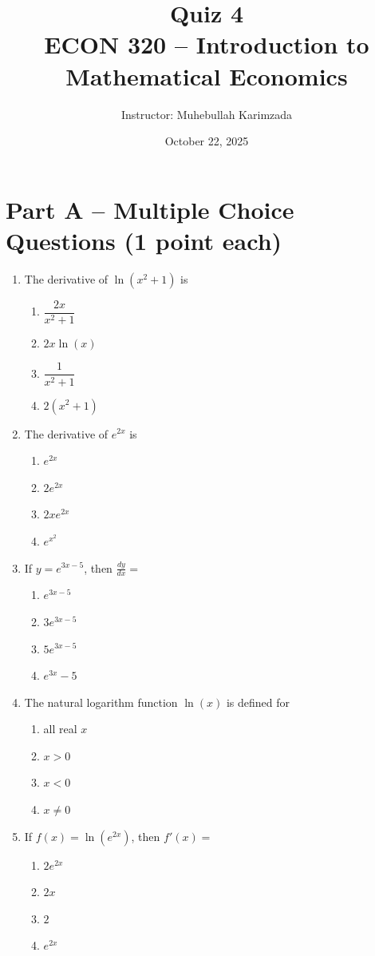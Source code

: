 \documentclass[12pt]{article}
\title{Quiz 4\\ \vspace{10pt}
\large ECON 320 -- Introduction to Mathematical Economics}
\author{Instructor: Muhebullah Karimzada}
\date{October 22, 2025}
\begin{document}
\maketitle



\section*{Part A – Multiple Choice Questions (1 point each)}

\begin{enumerate}
\item The derivative of \( \ln(x^2 + 1) \) is  
\begin{enumerate}
\item \( \dfrac{2x}{x^2 + 1} \)
\item \( 2x\ln(x) \)
\item \( \dfrac{1}{x^2 + 1} \)
\item \( 2(x^2 + 1) \)
\end{enumerate}

\item The derivative of \( e^{2x} \) is  
\begin{enumerate}
\item \( e^{2x} \)
\item \( 2e^{2x} \)
\item \( 2xe^{2x} \)
\item \( e^{x^2} \)
\end{enumerate}

\item If \( y = e^{3x-5} \), then \( \frac{dy}{dx} = \)
\begin{enumerate}
\item \( e^{3x-5} \)
\item \( 3e^{3x-5} \)
\item \( 5e^{3x-5} \)
\item \( e^{3x} - 5 \)
\end{enumerate}
\newpage

\item The natural logarithm function \( \ln(x) \) is defined for  
\begin{enumerate}
\item all real \(x\)
\item \(x>0\)
\item \(x<0\)
\item \(x\neq0\)
\end{enumerate}

\item If \( f(x) = \ln(e^{2x}) \), then \( f'(x) = \)
\begin{enumerate}
\item \( 2e^{2x} \)
\item \( 2x \)
\item \( 2 \)
\item \( e^{2x} \)
\end{enumerate}


\end{enumerate}
\end{document}
